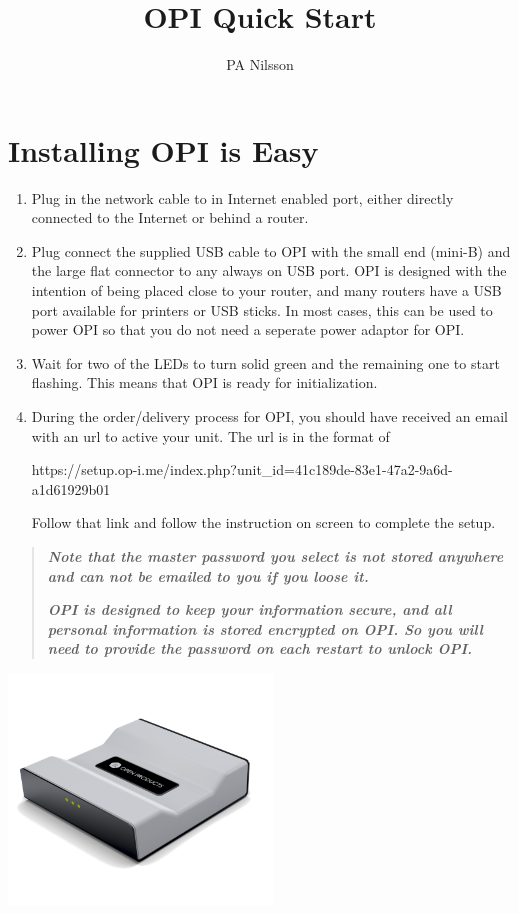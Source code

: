 \documentclass[12pt,a4paper,titlepage]{article}
\author{PA Nilsson}
\title{OPI Quick Start}
\begin{document}
\section{Installing OPI is Easy}
	\begin{enumerate}

		\item Plug in the network cable to in Internet enabled port, either directly connected to the Internet or behind a router.

		\item Plug connect the supplied USB cable to OPI with the small end (mini-B) and the large flat connector to any always on USB port. OPI is designed with the intention of being placed close to your router, and many routers have a USB port available for printers or USB sticks. In most cases, this can be used to power OPI so that you do not need a seperate power adaptor for OPI.

		\item Wait for two of the LEDs to turn solid green and the remaining one to start flashing. This means that OPI is ready for initialization.

		\item During the order/delivery process for OPI, you should have received an email with an url to active your unit. The url is in the format of

\begin{small}
https://setup.op-i.me/index.php?unit\_id=41c189de-83e1-47a2-9a6d-a1d61929b01
\end{small}

Follow that link and follow the instruction on screen to complete the setup.

\end{enumerate}
\begin{quote}
\emph{\textbf{
Note that the master password you select is not stored anywhere and can not be emailed to you if you loose it.
}}

\emph{\textbf{
OPI is designed to keep your information secure, and all personal information is stored encrypted on OPI. So you will need to provide the password on each restart to unlock OPI.
}}
\end{quote}

\begin{center}
	\includegraphics[width=7cm]{./img/OPI_iso}
\end{center}
\end{document}
